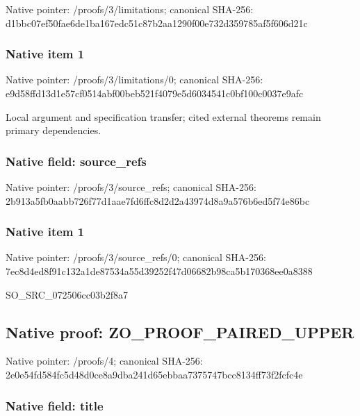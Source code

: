 \documentclass[10pt,a4paper]{article}
\begin{document}
Native pointer: /proofs/3/limitations; canonical SHA-256: d1bbc07ef50fae6de1ba167e\allowbreak{}dc51c87b2aa1290f00e732d3\allowbreak{}59785af5f606d21c



\subsubsection{Native item 1}


Native pointer: /proofs/3/limitations/0; canonical SHA-256: e9d58ffd13d1e57cf0514abf\allowbreak{}00beb521f4079e5d6034541c\allowbreak{}0bf100c0037e9afc


Local argument and specification transfer; cited external theorems remain primary dependencies.


\subsubsection{Native field: source\_refs}


Native pointer: /proofs/3/source\_refs; canonical SHA-256: 2b913a5fb0aabb726f77d1aa\allowbreak{}e7fd6ffc8d2d2a43974d8a9a\allowbreak{}576b6ed5f74e86bc



\subsubsection{Native item 1}


Native pointer: /proofs/3/source\_refs/0; canonical SHA-256: 7ec8d4ed8f91c132a1de8753\allowbreak{}4a55d39252f47d06682b98ca\allowbreak{}5b170368ee0a8388


SO\_SRC\_072506cc03b2f8a7


\subsection{Native proof: ZO\_PROOF\_PAIRED\_UPPER}


Native pointer: /proofs/4; canonical SHA-256: 2e0e54fd584fc5d48d0ce8a9\allowbreak{}dba241d65ebbaa7375747bcc\allowbreak{}8134ff73f2fcfc4e



\subsubsection{Native field: title}
\end{document}
